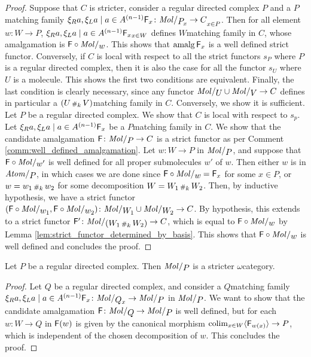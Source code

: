 \begin{proof}
    Suppose that \( C \) is stricter, consider a regular directed complex \( P \) and a \( P \)\nbd matching family \( \set{\F_x \colon \molecin{\imel{P}{x}} \to C}_{x \in P} \).
    Then for all element \( w \colon W \to P \), \( \set{\F_x}_{x \in W} \) defines \( W \)\nbd matching family in \( C \), whose amalgamation is \( \F \after \molecin{w} \).
    This shows that \( \operatorname*{\mathrm{amalg}} \mathsf{F}_x \) is a well defined strict functor.
    Conversely, if \( C \) is local with respect to all the strict functors \( s_P \) where \( P \) is a regular directed complex, then it is also the case for all the functor \( s_U \) where \( U \) is a molecule.
    This shows the first two conditions are equivalent.
    Finally, the last condition is clearly necessary, since any functor \( \molecin{U} \cup \molecin{V} \to C \) defines in particular a \( (U \,{\scriptstyle\#}_{k}\, V) \)\nbd matching family in \( C \).
    Conversely, we show it is sufficient.
    Let \( P \) be a regular directed complex.
    We show that \( C \) is local with respect to \( s_p \).
    Let \( \set{\F_x} \) be a \( P \)\nbd matching family in \( C \).
    We show that the candidate amalgamation \( \F \colon \molecin{P} \to C \) is a strict functor as per Comment \ref{comm:well_defined_amalgamation}.
    Let \( w \colon W \to P \) in \( \molecin{P} \), and suppose that \( \F \after \molecin{w'} \) is well defined for all proper submolecules \( w' \) of \( w \).
    Then either \( w \) is in \( \atomin{P} \), in which cases we are done since \( \F \after \molecin{w} = \F_x \) for some \( x \in P \), or \( w = w_1 \,{\scriptstyle\#}_{k}\, w_2 \) for some decomposition \( W = W_1 \,{\scriptstyle\#}_{k}\, W_2 \).
    Then, by inductive hypothesis, we have a strict functor \( (\F \after \molecin{w_1}, \F \after \molecin{w_2}) \colon \molecin{W_1} \cup \molecin{W_2} \to C \).
    By hypothesis, this extends to a strict functor \( \F' \colon \molecin{(W_1 \cp{k} W_2)} \to C \), which is equal to \( \F \after \molecin{w} \) by Lemma \ref{lem:strict_functor_determined_by_basis}.
    This shows that \( \F \after \molecin{w} \) is well defined and concludes the proof.
\end{proof}

\begin{prop} \label{prop:regular_directed_complex_stricter}
    Let \( P \) be a regular directed complex.
    Then \( \molecin{P} \) is a stricter \( \omega \)\nbd category.
\end{prop}
\begin{proof}
    Let \( Q \) be a regular directed complex, and consider a \( Q \)\nbd matching family \( \set{\F_x \colon \molecin{\imel{Q}{x}} \to \molecin{P}} \) in \( \molecin{P} \).
    We want to show that the candidate amalgamation \( \F \colon \molecin{Q} \to \molecin{P} \) is well defined, but for each \( w \colon W \to Q \) in \( \mathsf{F}(w) \) is given by the canonical morphism \( \operatorname*{colim}_{x \in W} \langle\mathsf{F}_{w(x)}\rangle \to P \), which is independent of the chosen decomposition of \( w \).
    This concludes the proof.
\end{proof}

